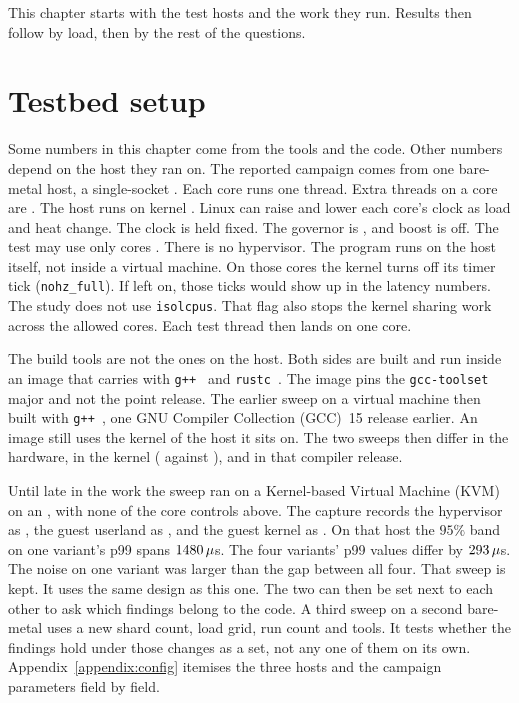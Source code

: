 \documentclass[english,oneside,a4paper,censored,csm,software-track-2020]{HYthesisML}
\begin{document}
This chapter starts with the test hosts and the work they run. Results then
follow by load, then by the rest of the questions.

\section{Testbed setup\label{sec:testbed}}
Some numbers in this chapter come from the tools and the code. Other
numbers depend on the host they ran on. The reported campaign comes from
one bare-metal host, a single-socket \MainCpu{}. Each core runs one
thread. Extra threads on a core are \MainSmt{}. The host runs
\MainHostDistro{} on kernel \MainKernel{}. Linux can raise and
lower each core's clock as load and heat change. The clock is held
fixed. The governor is \MainGovernor{}, and boost is off. The
test may use only cores \MainPinned{}. There is no hypervisor. The
program runs on the host itself, not inside a virtual machine. On those
cores the kernel turns off its timer tick (\texttt{nohz\_full}).
If left on, those ticks would show up in the latency numbers. The study does
not use \texttt{isolcpus}. That flag also stops the kernel sharing work
across the allowed cores. Each test thread then lands on one core.

The build tools are not the ones on the host. Both sides are built
and run inside an image that carries \MainDistro{} with
\texttt{g++~\MainGpp} and \texttt{rustc~\MainRustc}. The image pins the
\texttt{gcc-toolset} major and not the point release. The earlier
sweep on a virtual machine then built with \texttt{g++~\GuestGpp},
one GNU Compiler Collection (GCC)~15 release earlier. An image still uses the kernel of the host
it sits on. The two sweeps then differ in the hardware, in the kernel
(\MainKernel{} against \GuestKernel{}), and in that compiler release.

Until late in the work the sweep ran on a Kernel-based Virtual Machine (KVM)
on an \GuestCpu{}, with none of the core controls above. The capture records
the hypervisor as \GuestVirt{}, the guest userland as \GuestDistro{}, and the
guest kernel as \GuestKernel{}. On that
host the $95\%$ band on one variant's p99 spans
$1480\,\mu$s. The four variants' p99 values differ by
$293\,\mu$s. The noise on one variant was larger than the gap
between all four. That sweep is kept. It uses the same design as
this one. The two can then be set next to each other to ask which findings belong to the code.
A third sweep on a second bare-metal \BmCpu{} uses a new shard count, load
grid, run count and tools. It tests whether the findings hold under those
changes as a set, not any one of them on its own.
Appendix~\ref{appendix:config} itemises the three hosts and the campaign
parameters field by field.
\end{document}
